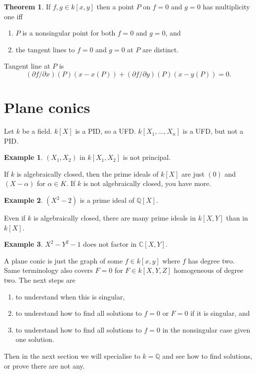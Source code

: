 \documentclass{article}
\newcommand{\Q}{\mathbb{Q}}
\newcommand{\C}{\mathbb{C}}
\newcommand{\rb}[1]{\left( #1 \right)}
\renewcommand{\sb}[1]{\left[ #1 \right]}
\theoremstyle{definition}\newtheorem{definition}{Definition}[section]
\theoremstyle{definition}\newtheorem{remark}[definition]{Remark}
\theoremstyle{definition}\newtheorem*{example}{Example}
\theoremstyle{definition}\newtheorem*{note}{Note}
\newtheorem{theorem}[definition]{Theorem}
\begin{document}
\begin{theorem}
\label{thm:2.10}
If $ f, g \in k\sb{x, y} $ then a point $ P $ on $ f = 0 $ and $ g = 0 $ has multiplicity one iff
\begin{enumerate}
\item $ P $ is a nonsingular point for both $ f = 0 $ and $ g = 0 $, and
\item the tangent lines to $ f = 0 $ and $ g = 0 $ at $ P $ are distinct.
\end{enumerate}
Tangent line at $ P $ is
$$ \rb{\partial f / \partial x}\rb{P}\rb{x - x\rb{P}} + \rb{\partial f / \partial y}\rb{P}\rb{x - y\rb{P}} = 0. $$
\end{theorem}

\section{Plane conics}

Let $ k $ be a field. $ k\sb{X} $ is a PID, so a UFD. $ k\sb{X_1, \dots, X_n} $ is a UFD, but not a PID.

\begin{example}
$ \rb{X_1, X_2} $ in $ k\sb{X_1, X_2} $ is not principal.
\end{example}

If $ k $ is algebraically closed, then the prime ideals of $ k\sb{X} $ are just $ \rb{0} $ and $ \rb{X - \alpha} $ for $ \alpha \in K $. If $ k $ is not algebraically closed, you have more.

\begin{example}
$ \rb{X^2 - 2} $ is a prime ideal of $ \Q\sb{X} $.
\end{example}

Even if $ k $ is algebraically closed, there are many prime ideals in $ k\sb{X, Y} $ than in $ k\sb{X} $.

\begin{example}
$ X^2 - Y^2 - 1 $ does not factor in $ \C\sb{X, Y} $.
\end{example}


A plane conic is just the graph of some $ f \in k\sb{x, y} $ where $ f $ has degree two. Same terminology also covers $ F = 0 $ for $ F \in k\sb{X, Y, Z} $ homogeneous of degree two. The next steps are
\begin{enumerate}
\item to understand when this is singular,
\item to understand how to find all solutions to $ f = 0 $ or $ F = 0 $ if it is singular, and
\item to understand how to find all solutions to $ f = 0 $ in the nonsingular case given one solution.
\end{enumerate}
Then in the next section we will specialise to $ k = \Q $ and see how to find solutions, or prove there are not any.
\end{document}
